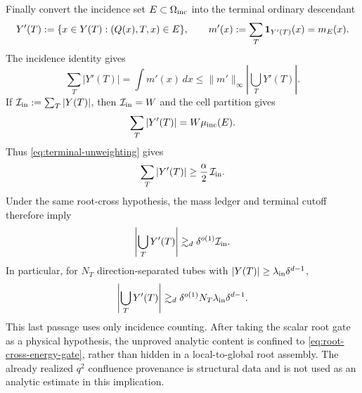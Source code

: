 \documentclass[11pt]{article}
\begin{document}
Finally convert the incidence set \(E\subset\Omega_{\rm inc}\) into the
terminal ordinary descendant
\[
 Y'(T)
 :=\{x\in Y(T):(Q(x),T,x)\in E\},
 \qquad
 m'(x):=\sum_T{\bf1}_{Y'(T)}(x)=m_E(x).
\]
The incidence identity gives
\begin{equation}\label{eq:terminal-incidence-volume}
 \sum_T|Y'(T)|
 =\int m'(x)\,dx
 \le
 \|m'\|_\infty
 \left|\bigcup_TY'(T)\right|.
\end{equation}
If \(\mathcal I_{\rm in}:=\sum_T|Y(T)|\), then
\(\mathcal I_{\rm in}=W\) and the cell partition gives
\[
 \sum_T|Y'(T)|
 =W\mu_{\rm inc}(E).
\]
Thus \eqref{eq:terminal-unweighting} gives
\[
 \sum_T|Y'(T)|
 \ge\frac\alpha2\,\mathcal I_{\rm in}.
\]
Under the same root-cross hypothesis, the mass ledger and terminal cutoff
therefore imply
\[
 \left|\bigcup_TY'(T)\right|
 \gtrsim_d
 \delta^{o(1)}\mathcal I_{\rm in}.
\]
In particular, for \(N_T\) direction-separated tubes with
\(|Y(T)|\ge\lambda_{\rm in}\delta^{d-1}\),
\[
 \left|\bigcup_TY'(T)\right|
 \gtrsim_d
 \delta^{o(1)}N_T\lambda_{\rm in}\delta^{d-1}.
\]
This last passage uses only incidence counting.  After taking the scalar root
gate as a physical hypothesis, the unproved analytic content is confined to
\eqref{eq:root-cross-energy-gate}, rather than hidden in a local-to-global root
assembly.  The already realized \(q^2\) confluence provenance is structural
data and is not used as an analytic estimate in this implication.
\end{document}
